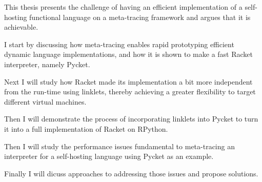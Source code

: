 This thesis presents the challenge of having an efficient
implementation of a self-hosting functional language on a meta-tracing
framework and argues that it is achievable.

I start by discussing how meta-tracing enables rapid prototyping
efficient dynamic language implementations, and how it is shown to
make a fast Racket interpreter, namely Pycket.

Next I will study how Racket made its implementation a bit more
independent from the run-time using linklets, thereby achieving a
greater flexibility to target different virtual machines.

Then I will demonstrate the process of incorporating linklets into
Pycket to turn it into a full implementation of Racket on RPython.

Then I will study the performance issues fundamental to
meta-tracing an interpreter for a self-hosting language using Pycket
as an example.

Finally I will dicuss approaches to addressing those issues and
propose solutions.
